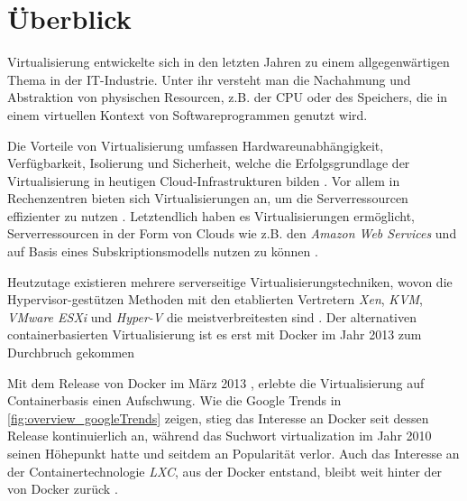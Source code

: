 \documentclass[../main.tex]{subfiles}
\begin{document}
\chapter{Überblick}
\label{overview}
  Virtualisierung entwickelte sich in den letzten Jahren zu einem allgegenwärtigen Thema in der IT-Industrie. Unter ihr versteht man die Nachahmung und Abstraktion von physischen Resourcen, z.B. der CPU oder des Speichers, die in einem virtuellen Kontext von Softwareprogrammen genutzt wird.

  Die Vorteile von Virtualisierung umfassen Hardwareunabhängigkeit, Verfügbarkeit, Isolierung und Sicherheit, welche die Erfolgsgrundlage der Virtualisierung in heutigen Cloud-Infrastrukturen bilden \cite[S.1]{containerVirtPerformance}. Vor allem in Rechenzentren bieten sich Virtualisierungen an, um die Serverressourcen effizienter zu nutzen \cite[S.1]{dockerSec1}. Letztendlich haben es Virtualisierungen ermöglicht, Serverressourcen in der Form von \glspl{Cloud} wie z.B. den \emph{Amazon Web Services}\cite{amazonWebServices} und auf Basis eines Subskriptionsmodells nutzen zu können \cite[S.1]{dockerSec1}.

  Heutzutage existieren mehrere serverseitige Virtualisierungstechniken, wovon die Hypervisor-gestützen Methoden mit den etablierten Vertretern \emph{Xen}\cite{xen}, \emph{KVM}\cite{kvm}, \emph{VMware ESXi}\cite{vmwareESXi} und \emph{Hyper-V}\cite{hyperv} die meistverbreitesten sind \cite[S.2]{containerVirtPerformance}. Der alternativen containerbasierten Virtualisierung ist es erst mit Docker im Jahr 2013 zum Durchbruch gekommen


  Mit dem Release von Docker im März 2013 \cite{githubDockerChangelog}, erlebte die Virtualisierung auf Containerbasis einen Aufschwung. Wie die Google Trends in \fig \ref{fig:overview_googleTrends} zeigen, stieg das Interesse an Docker seit dessen Release kontinuierlich an, während das Suchwort \glqq{}virtualization\grqq{} im Jahr 2010 seinen Höhepunkt hatte und seitdem an Popularität verlor. Auch das Interesse an der Containertechnologie \emph{LXC}, aus der Docker entstand, bleibt weit hinter der von Docker zurück \cite{googleTrends}.
\end{document}
